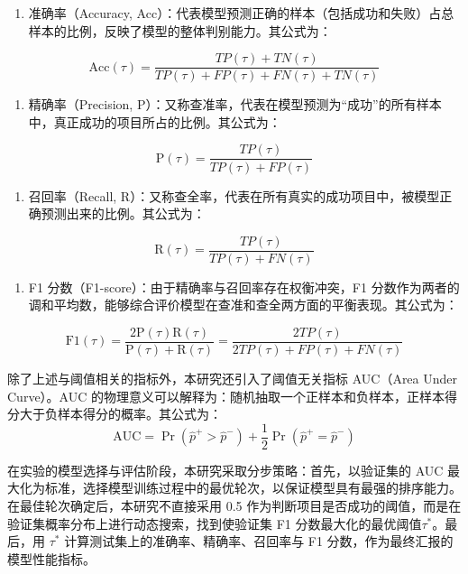\begin{enumerate}
\def\labelenumi{(\arabic{enumi})}
\item
  准确率（Accuracy, Acc）：代表模型预测正确的样本（包括成功和失败）占总样本的比例，反映了模型的整体判别能力。其公式为：
\end{enumerate}
\begin{equation}
\mathrm{Acc}(\tau)=\frac{TP(\tau)+TN(\tau)}{TP(\tau)+FP(\tau)+FN(\tau)+TN(\tau)}
\end{equation}
\begin{enumerate}
\def\labelenumi{(\arabic{enumi})}
\setcounter{enumi}{1}
\item
  精确率（Precision, P）：又称查准率，代表在模型预测为``成功''的所有样本中，真正成功的项目所占的比例。其公式为：
\end{enumerate}
\begin{equation}
\mathrm{P}(\tau)=\frac{TP(\tau)}{TP(\tau)+FP(\tau)}
\end{equation}
\begin{enumerate}
\def\labelenumi{(\arabic{enumi})}
\setcounter{enumi}{2}
\item
  召回率（Recall, R）：又称查全率，代表在所有真实的成功项目中，被模型正确预测出来的比例。其公式为：
\end{enumerate}
\begin{equation}
\mathrm{R}(\tau)=\frac{TP(\tau)}{TP(\tau)+FN(\tau)}
\end{equation}
\begin{enumerate}
\def\labelenumi{(\arabic{enumi})}
\setcounter{enumi}{3}
\item
  F1 分数（F1-score）：由于精确率与召回率存在权衡冲突，F1 分数作为两者的调和平均数，能够综合评价模型在查准和查全两方面的平衡表现。其公式为：
\end{enumerate}
\begin{equation}
\mathrm{F1}(\tau)=\frac{2\mathrm{P}(\tau)\mathrm{R}(\tau)}{\mathrm{P}(\tau)+\mathrm{R}(\tau)}=\frac{2TP(\tau)}{2TP(\tau)+FP(\tau)+FN(\tau)}
\end{equation}

除了上述与阈值相关的指标外，本研究还引入了阈值无关指标 AUC（Area Under Curve）。AUC 的物理意义可以解释为：随机抽取一个正样本和负样本，正样本得分大于负样本得分的概率。其公式为：
\begin{equation}
\mathrm{AUC}=\Pr(\hat{p}^+>\hat{p}^-)+\frac{1}{2}\Pr(\hat{p}^+=\hat{p}^-)
\end{equation}

在实验的模型选择与评估阶段，本研究采取分步策略：首先，以验证集的 AUC 最大化为标准，选择模型训练过程中的最优轮次，以保证模型具有最强的排序能力。在最佳轮次确定后，本研究不直接采用 0.5 作为判断项目是否成功的阈值，而是在验证集概率分布上进行动态搜索，找到使验证集 F1 分数最大化的最优阈值$ \tau^* $。最后，用 $ \tau^* $ 计算测试集上的准确率、精确率、召回率与 F1 分数，作为最终汇报的模型性能指标。

